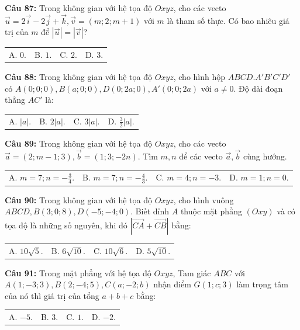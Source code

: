 \documentclass[12pt]{article}
\begin{document}
	\vspace{2mm}
	\noindent \textbf{Câu 87:} Trong không gian với hệ tọa độ $Oxyz$, cho các vecto $\vec{u} = 2\vec{i} - 2\vec{j} + \vec{k}, \vec{v} = (m; 2; m+1)$ với $m$ là tham số thực. Có bao nhiêu giá trị của $m$ để $|\vec{u}| = |\vec{v}|$? \\
	\noindent
	\begin{tabular}{p{} p{} p{} p{}}
		A. $0$. & B. $1$. & C. $2$. & D. $3$.
	\end{tabular}
	
	\vspace{2mm}
	\noindent \textbf{Câu 88:} Trong không gian với hệ tọa độ $Oxyz$, cho hình hộp $ABCD.A'B'C'D'$ có $A(0;0;0), B(a;0;0), D(0;2a;0), A'(0;0;2a)$ với $a \neq 0$. Độ dài đoạn thẳng $AC'$ là: \\
	\noindent
	\begin{tabular}{p{} p{} p{} p{}}
		A. $|a|$. & B. $2|a|$. & C. $3|a|$. & D. $\frac{3}{2}|a|$.
	\end{tabular}
	
	\vspace{2mm}
	\noindent \textbf{Câu 89:} Trong không gian với hệ tọa độ $Oxyz$, cho các vecto $\vec{a} = (2; m-1; 3), \vec{b} = (1; 3; -2n)$. Tìm $m, n$ để các vecto $\vec{a}, \vec{b}$ cùng hướng. \\
	\noindent
	\begin{tabular}{p{} p{} p{} p{}}
		A. $m = 7; n = -\frac{3}{4}$. & B. $m = 7; n = -\frac{4}{3}$. & C. $m = 4; n = -3$. & D. $m = 1; n = 0$.
	\end{tabular}
	
	\vspace{2mm}
	\noindent \textbf{Câu 90:} Trong không gian với hệ tọa độ $Oxyz$, cho hình vuông $ABCD, B(3;0;8), D(-5;-4;0)$. Biết đỉnh $A$ thuộc mặt phẳng $(Oxy)$ và có tọa độ là những số nguyên, khi đó $|\vec{CA} + \vec{CB}|$ bằng: \\
	\noindent
	\begin{tabular}{p{} p{} p{} p{}}
		A. $10\sqrt{5}$. & B. $6\sqrt{10}$. & C. $10\sqrt{6}$. & D. $5\sqrt{10}$.
	\end{tabular}
	
	\vspace{2mm}
	\noindent \textbf{Câu 91:} Trong mặt phẳng với hệ tọa độ $Oxyz$, Tam giác $ABC$ với $A(1;-3;3), B(2;-4;5), C(a;-2;b)$ nhận điểm $G(1;c;3)$ làm trọng tâm của nó thì giá trị của tổng $a+b+c$ bằng: \\
	\noindent
	\begin{tabular}{p{} p{} p{} p{}}
		A. $-5$. & B. $3$. & C. $1$. & D. $-2$.
	\end{tabular}
	
\end{document}
